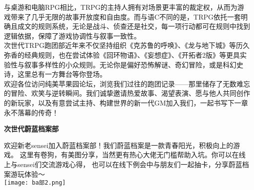 \normalsize
\par
\vspace{-0.6em}
\chind 与桌游和电脑RPG相比，TRPG的主持人拥有对场景更丰富的裁定权，从而为游戏带来了几乎无限的故事开放度和自由度。而与语C不同的是，TRPG依托一套明确且成文的规则系统，无论是战斗、侦查还是社交，每一项行动都可在规则中找到逻辑依据，保障了游戏协调性与叙事一致性。\\
\chind 次世代TRPG跑团部近年来不仅坚持组织《克苏鲁的呼唤》、《龙与地下城》等历久弥香的经典规则，也在尝试体验《回环物语》、《妄想症》、《开拓者2版》等更具实验性与叙事多样性的小众规则。无论你是偏好恐怖解谜、奇幻冒险，或是科幻史诗，这里总有一方舞台等你登场。\\
\chind 欢迎各位访问纯美苹果园论坛，浏览我们过往的跑团记录——那里储存了无数难忘的冒险、欢笑与逆转瞬间。我们诚挚邀请热爱故事、渴望表演、愿与他人共同创作的新玩家，以及有意尝试主持、构建世界的新一代GM加入我们，一起书写下一章永不落幕的传奇！\\
\par
\vspace{2em}
\fontsize{23pt}{24pt}\selectfont
\textbf{\textcolor{truepurple}{次世代蔚蓝档案部}}\\
\vspace{0.2em}

\normalsize
\chind 欢迎新老sensei加入蔚蓝档案部！我们蔚蓝档案是一款青春阳光，积极向上的游戏。
这里有卷狗，有美图分享，当然更有热心大佬无门槛帮助入坑。你可以在线上与sensei们交流游戏心得，
也可以在线下例会中与朋友们一起抽卡，分享蔚蓝档案游玩体验～\\
\hspace*{-1.8em}
\texttt{[image: ba部2.png]}

